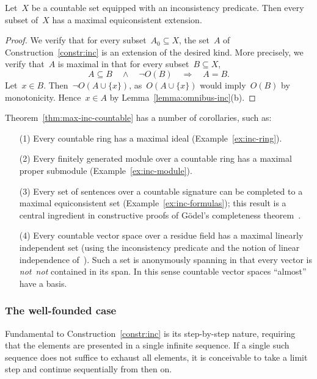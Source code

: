 \documentclass[envcountsect,envcountsame,runningheads]{llncs}
\renewcommand{\_}{\mathpunct{.}\,}
\begin{document}
\begin{theorem}\label{thm:max-inc-countable}Let~$X$ be a countable set equipped
with an inconsistency predicate. Then every subset of~$X$ has a maximal
equiconsistent extension.\end{theorem}

\begin{proof}We verify that for every subset~$A_0 \subseteq X$, the set~$A$ of
Construction~\ref{constr:inc} is an extension of the desired kind. More
precisely, we verify that~$A$ is maximal in that for every subset~$B \subseteq X$,
\[ A \subseteq B \quad\wedge\quad \neg O(B) \quad\Longrightarrow\quad A = B. \]
Let~$x \in B$. Then~$\neg O(A \cup \{ x \})$, as~$O(A \cup \{x\})$
would imply~$O(B)$ by monotonicity. Hence~$x \in A$ by
Lemma~\ref{lemma:omnibus-inc}(b).
\end{proof}

Theorem~\ref{thm:max-inc-countable} has a number of corollaries, such as:
\begin{enumerate}
\item[(1)] Every countable ring has a maximal ideal (Example~\ref{ex:inc-ring}).
\item[(2)] Every finitely generated module
over a countable ring has a maximal proper submodule
(Example~\ref{ex:inc-module}).
\item[(3)] Every set of sentences over a countable signature can be completed to a
maximal equiconsistent set (Example~\ref{ex:inc-formulas});
this result is a central ingredient in constructive proofs of
Gödel's completeness theorem~\cite{krivine:completeness,herbelin-ilik:henkin,forster-kirst-wehr:completeness}.
\item[(4)] Every countable vector space over a residue field has a maximal linearly
independent set (using the inconsistency predicate and the notion of linear
independence of~\cite[Section~6]{wessel-schuster:radical}). Such a set is
anonymously spanning in that every vector is \emph{not~not} contained in its
span. In this sense countable vector spaces ``almost'' have a basis.
\end{enumerate}


\subsubsection{The well-founded case}

Fundamental to Construction~\ref{constr:inc} is its step-by-step nature,
requiring that the elements are presented in a single infinite sequence.
If a single such sequence does not
suffice to exhaust all elements, it is conceivable to take a limit step and continue
sequentially from then on.
\end{document}
